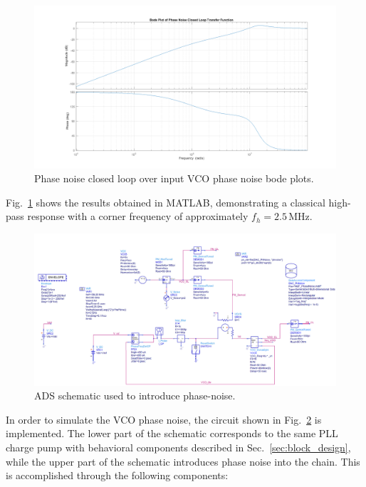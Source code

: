 \documentclass[lettersize,journal]{IEEEtran}
\begin{document}
\begin{figure}[!ht]
    \centering
    \includegraphics[width=1\linewidth]{images/ads_results/phase_noise/phase_noise_plots.png}
    \caption{Phase noise closed loop over input VCO phase noise bode plots.}
    \label{fig:phase_noise_bode}
\end{figure}

Fig.~\ref{fig:phase_noise_bode} shows the results obtained in MATLAB, demonstrating a classical high-pass response with a corner frequency of approximately \(f_h = 2.5 \, \text{MHz}\).

\begin{figure}[!ht]
    \centering
    \includegraphics[width=1\linewidth]{images/ads_results/phase_noise/phase_noise.png}
    \caption{ADS schematic used to introduce phase-noise.}
    \label{fig:phase_noise}
\end{figure}

In order to simulate the VCO phase noise, the circuit shown in Fig.~\ref{fig:phase_noise} is implemented. The lower part of the schematic corresponds to the same PLL charge pump with behavioral components described in Sec.~\ref{sec:block_design}, while the upper part of the schematic introduces phase noise into the chain. This is accomplished through the following components:
\end{document}
